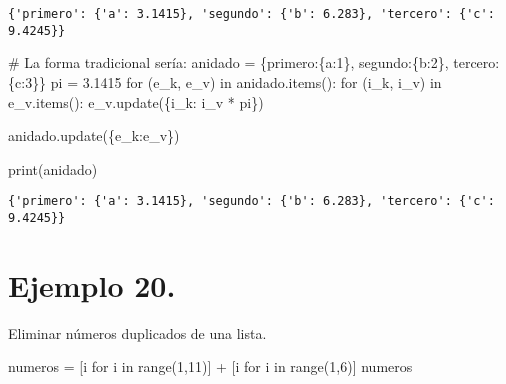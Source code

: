 \documentclass[
  letterpaper,
  DIV=11,
  numbers=noendperiod]{scrreprt}
\newenvironment{Shaded}{\begin{snugshade}}{\end{snugshade}}
\newcommand{\BuiltInTok}[1]{\textcolor[rgb]{0.00,0.23,0.31}{#1}}
\newcommand{\CommentTok}[1]{\textcolor[rgb]{0.37,0.37,0.37}{#1}}
\newcommand{\ControlFlowTok}[1]{\textcolor[rgb]{0.00,0.23,0.31}{#1}}
\newcommand{\DecValTok}[1]{\textcolor[rgb]{0.68,0.00,0.00}{#1}}
\newcommand{\FloatTok}[1]{\textcolor[rgb]{0.68,0.00,0.00}{#1}}
\newcommand{\KeywordTok}[1]{\textcolor[rgb]{0.00,0.23,0.31}{#1}}
\newcommand{\NormalTok}[1]{\textcolor[rgb]{0.00,0.23,0.31}{#1}}
\newcommand{\OperatorTok}[1]{\textcolor[rgb]{0.37,0.37,0.37}{#1}}
\newcommand{\StringTok}[1]{\textcolor[rgb]{0.13,0.47,0.30}{#1}}
\begin{document}
\begin{verbatim}
{'primero': {'a': 3.1415}, 'segundo': {'b': 6.283}, 'tercero': {'c': 9.4245}}
\end{verbatim}

\begin{Shaded}
\begin{Highlighting}[]
\CommentTok{\# La forma tradicional sería:}
\NormalTok{anidado }\OperatorTok{=}\NormalTok{ \{}\StringTok{\textquotesingle{}primero\textquotesingle{}}\NormalTok{:\{}\StringTok{\textquotesingle{}a\textquotesingle{}}\NormalTok{:}\DecValTok{1}\NormalTok{\}, }\StringTok{\textquotesingle{}segundo\textquotesingle{}}\NormalTok{:\{}\StringTok{\textquotesingle{}b\textquotesingle{}}\NormalTok{:}\DecValTok{2}\NormalTok{\}, }\StringTok{\textquotesingle{}tercero\textquotesingle{}}\NormalTok{:\{}\StringTok{\textquotesingle{}c\textquotesingle{}}\NormalTok{:}\DecValTok{3}\NormalTok{\}\}}
\NormalTok{pi }\OperatorTok{=} \FloatTok{3.1415}
\ControlFlowTok{for}\NormalTok{ (e\_k, e\_v) }\KeywordTok{in}\NormalTok{ anidado.items():}
    \ControlFlowTok{for}\NormalTok{ (i\_k, i\_v) }\KeywordTok{in}\NormalTok{ e\_v.items():}
\NormalTok{        e\_v.update(\{i\_k: i\_v }\OperatorTok{*}\NormalTok{ pi\})}
        
\NormalTok{anidado.update(\{e\_k:e\_v\})}

\BuiltInTok{print}\NormalTok{(anidado)}
\end{Highlighting}
\end{Shaded}

\begin{verbatim}
{'primero': {'a': 3.1415}, 'segundo': {'b': 6.283}, 'tercero': {'c': 9.4245}}
\end{verbatim}

\section{\texorpdfstring{\textbf{Ejemplo
20.}}{Ejemplo 20.}}\label{ejemplo-20.}

Eliminar números duplicados de una lista.

\begin{Shaded}
\begin{Highlighting}[]
\NormalTok{numeros }\OperatorTok{=}\NormalTok{ [i }\ControlFlowTok{for}\NormalTok{ i }\KeywordTok{in} \BuiltInTok{range}\NormalTok{(}\DecValTok{1}\NormalTok{,}\DecValTok{11}\NormalTok{)] }\OperatorTok{+}\NormalTok{ [i }\ControlFlowTok{for}\NormalTok{ i }\KeywordTok{in} \BuiltInTok{range}\NormalTok{(}\DecValTok{1}\NormalTok{,}\DecValTok{6}\NormalTok{)]}
\NormalTok{numeros}
\end{Highlighting}
\end{Shaded}
\end{document}
